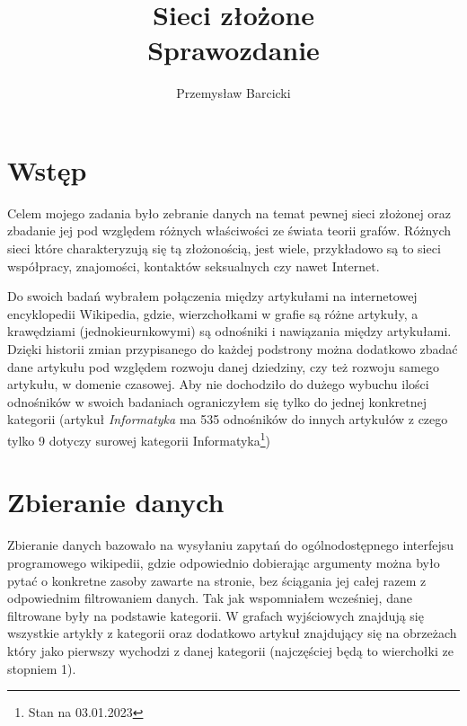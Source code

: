 \documentclass[a4paper, 12pt]{article}
\begin{document}
\title{
    \huge{Sieci złożone} \\
    \small{Sprawozdanie}
}
\author{Przemysław Barcicki}
\maketitle

\thispagestyle{empty}

\section{Wstęp}
Celem mojego zadania było zebranie danych na temat pewnej sieci złożonej oraz zbadanie jej pod względem różnych właściwości ze świata teorii grafów. Różnych sieci które charakteryzują się tą złożonością, jest wiele, przykładowo są to sieci współpracy, znajomości, kontaktów seksualnych czy nawet Internet.

Do swoich badań wybrałem połączenia między artykułami na internetowej encyklopedii Wikipedia, gdzie, wierzchołkami w grafie są różne artykuły, a krawędziami (jednokieurnkowymi) są odnośniki i nawiązania między artykułami. Dzięki historii zmian przypisanego do każdej podstrony można dodatkowo zbadać dane artykułu pod względem rozwoju danej dziedziny, czy też rozwoju samego artykułu, w domenie czasowej. Aby nie dochodziło do dużego wybuchu ilości odnośników w swoich badaniach ograniczyłem się tylko do jednej konkretnej kategorii (artykuł \textit{Informatyka} ma 535 odnośników do innych artykułów z czego tylko 9 dotyczy surowej kategorii Informatyka\footnote{Stan na 03.01.2023})

\section{Zbieranie danych}
Zbieranie danych bazowało na wysyłaniu zapytań do ogólnodostępnego interfejsu programowego wikipedii, gdzie odpowiednio dobierając argumenty można było pytać o konkretne zasoby zawarte na stronie, bez ściągania jej całej razem z odpowiednim filtrowaniem danych. Tak jak wspomniałem wcześniej, dane filtrowane były na podstawie kategorii. W grafach wyjściowych znajdują się wszystkie artykły z kategorii oraz dodatkowo artykuł znajdujący się na obrzeżach który jako pierwszy wychodzi z danej kategorii (najczęściej będą to wierchołki ze stopniem 1).
\end{document}
